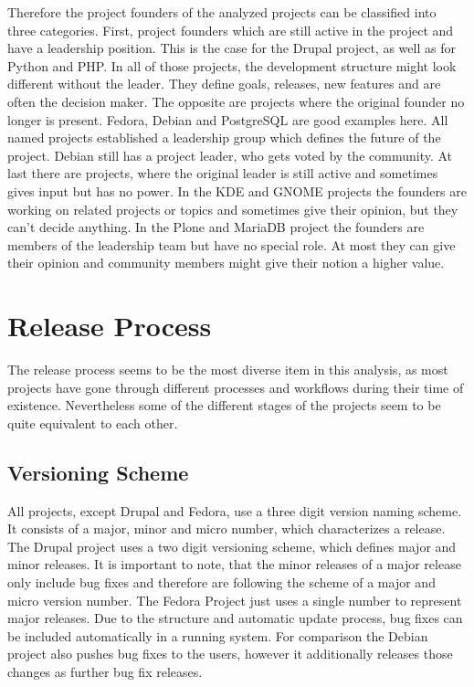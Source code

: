 Therefore the project founders of the analyzed projects can be classified into
three categories. First, project founders which are still active in the project
and have a leadership position. This is the case for the Drupal project, as
well as for Python and PHP. In all of those projects, the development structure
might look different without the leader. They define goals, releases, new
features and are often the decision maker. The opposite are projects where the
original founder no longer is present. Fedora, Debian and PostgreSQL are good
examples here. All named projects established a leadership group which defines
the future of the project. Debian still has a project leader, who gets voted by
the community. At last there are projects, where the original leader is still
active and sometimes gives input but has no power. In the KDE and GNOME
projects the founders are working on related projects or topics and sometimes
give their opinion, but they can't decide anything. In the Plone and MariaDB
project the founders are members of the leadership team but have no special
role. At most they can give their opinion and community members might give
their notion a higher value.



\section{Release Process} %

The release process seems to be the most diverse item in this analysis, as most
projects have gone through different processes and workflows during their time
of existence. Nevertheless some of the different stages of the projects seem to
be quite equivalent to each other.

\subsection{Versioning Scheme} %

All projects, except Drupal and Fedora, use a three digit version naming
scheme. It consists of a major, minor and micro number, which characterizes a
release. The Drupal project uses a two digit versioning scheme, which defines
major and minor releases. It is important to note, that the minor releases of a
major release only include bug fixes and therefore are following the scheme of
a major and micro version number. The Fedora Project just uses a single number
to represent major releases. Due to the structure and automatic update process,
bug fixes can be included automatically in a running system. For comparison the
Debian project also pushes bug fixes to the users, however it additionally
releases those changes as further bug fix releases.

